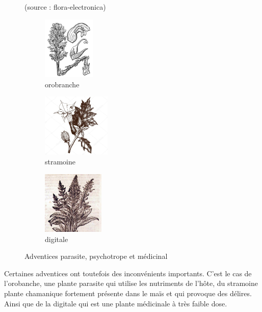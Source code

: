 \documentclass[../thesis.tex]{subfiles}
\begin{document}
    \begin{figure}[H]
        \centering
        {\scriptsize (source : flora-electronica)} \\
        \begin{subfigure}{0.2\linewidth}
            \includegraphics[height=3cm]{img/intro/plante-orobanche.jpg}
            \caption{orobranche}
        \end{subfigure}
        \hspace{1cm}
        \begin{subfigure}{0.2\linewidth}
            \includegraphics[height=3cm]{img/intro/plante-stramoine.jpg}
            \caption{stramoine}
        \end{subfigure}
        \hspace{1cm}
        \begin{subfigure}{0.2\linewidth}
            \includegraphics[height=3cm]{img/intro/plante-digitale}
            \caption{digitale}
        \end{subfigure}
        \caption{Adventices parasite, psychotrope et médicinal}
        \label{fig:02-adventice-toxique}
    \end{figure}
    
    \par Certaines adventices ont toutefois des inconvénients importants. C'est le cas de l'orobanche, une plante parasite qui utilise les nutriments de l'hôte, du stramoine plante chamanique fortement présente dans le maïs et qui provoque des délires. Ainsi que de la digitale qui est une plante médicinale à très faible dose.
    
\end{document}
